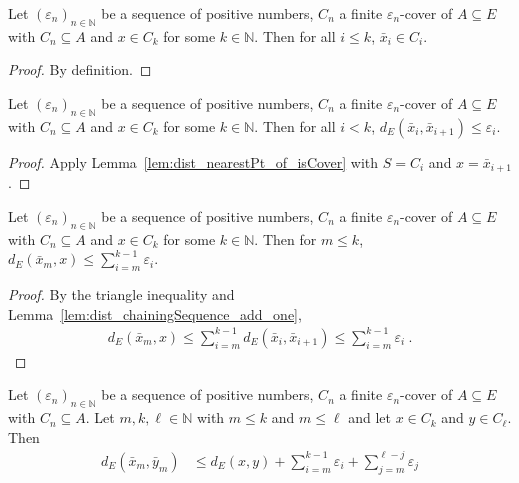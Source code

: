 \begin{lemma}\label{lem:chainingSequence_mem}
  \leanok
Let $(\varepsilon_n)_{n \in \mathbb{N}}$ be a sequence of positive numbers, $C_n$ a finite $\varepsilon_n$-cover of $A \subseteq E$ with $C_n \subseteq A$ and $x \in C_k$ for some $k \in \mathbb{N}$.
Then for all $i \le k$, $\bar{x}_i\in C_i$.
\end{lemma}

\begin{proof}\leanok
By definition.
\end{proof}


\begin{lemma}\label{lem:dist_chainingSequence_add_one}
  \leanok
Let $(\varepsilon_n)_{n \in \mathbb{N}}$ be a sequence of positive numbers, $C_n$ a finite $\varepsilon_n$-cover of $A \subseteq E$ with $C_n \subseteq A$ and $x \in C_k$ for some $k \in \mathbb{N}$.
Then for all $i < k$, $d_E(\bar{x}_i, \bar{x}_{i+1}) \le \varepsilon_i$.
\end{lemma}

\begin{proof}
Apply Lemma~\ref{lem:dist_nearestPt_of_isCover} with $S = C_i$ and $x = \bar{x}_{i+1}$.
\end{proof}


\begin{lemma}\label{lem:dist_chainingSequence_le_sum}
  \leanok
Let $(\varepsilon_n)_{n \in \mathbb{N}}$ be a sequence of positive numbers, $C_n$ a finite $\varepsilon_n$-cover of $A \subseteq E$ with $C_n \subseteq A$ and $x \in C_k$ for some $k \in \mathbb{N}$.
Then for $m \le k$, $d_E(\bar{x}_m, x) \le \sum_{i=m}^{k-1} \varepsilon_i$.
\end{lemma}

\begin{proof}
By the triangle inequality and Lemma~\ref{lem:dist_chainingSequence_add_one},
\begin{align*}
  d_E(\bar{x}_m, x)
  \le \sum_{i=m}^{k-1} d_E(\bar{x}_i, \bar{x}_{i+1})
  \le \sum_{i=m}^{k-1} \varepsilon_i
  \: .
\end{align*}
\end{proof}


\begin{lemma}\label{lem:dist_chainingSequence_le}
  \leanok
Let $(\varepsilon_n)_{n \in \mathbb{N}}$ be a sequence of positive numbers, $C_n$ a finite $\varepsilon_n$-cover of $A \subseteq E$ with $C_n \subseteq A$.
Let $m, k, \ell \in \mathbb{N}$ with $m \le k$ and $m \le \ell$ and let $x \in C_k$ and $y \in C_\ell$.
Then
\begin{align*}
  d_E(\bar{x}_m, \bar{y}_m)
  &\le d_E(x, y) + \sum_{i=m}^{k-1} \varepsilon_i + \sum_{j=m}^{\ell-j} \varepsilon_j
\end{align*}
\end{lemma}

